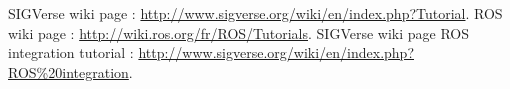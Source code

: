 \documentclass[notitlepage]{report}
\begin{document}
\sloppy %




\tableofcontents %







 



\begin{thebibliography}{9}
          SIGVerse wiki page : 
          \url{http://www.sigverse.org/wiki/en/index.php?Tutorial}.
          ROS wiki page :
          \url{http://wiki.ros.org/fr/ROS/Tutorials}.
          SIGVerse wiki page ROS integration tutorial :
          \url{http://www.sigverse.org/wiki/en/index.php?ROS%20integration}.
     
\end{thebibliography}
\end{document}
